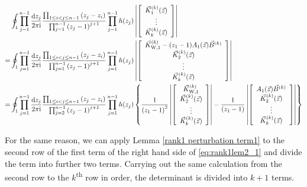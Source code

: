 \documentclass[cmp]{svjour}
\numberwithin{theorem}{section}
\numberwithin{equation}{section}
\def\dd{{\rm d}}
\def\ii{{\rm i}}
\begin{document}
\begin{align}
& \oint_{1} \prod_{j=1}^{n-1}{ \frac{\dd z_j}{2 \pi \ii} } \frac{ \prod_{1 \leq i < j \leq n-1}{(z_j - z_i)} }{ \prod_{j=1}^{n-1}{{(z_j -1)}^{j+1}} } \prod_{j=1}^{n-1}{h(z_j)} 
\left|
\left[
\begin{array}{c}
\vec{K}^{(k)}_{1}(\vec{z})  \\
\vdots \\
\vec{K}^{(k)}_{k}(\vec{z}) 
\end{array}
\right]
\right| \nonumber \\
= &  \oint_{1} \prod_{j=1}^{n-1}{ \frac{\dd z_j}{2 \pi \ii} } \frac{ \prod_{1 \leq i < j \leq n-1}{(z_j - z_i)} }{ \prod_{j=1}^{n-1}{{(z_j -1)}^{j+1}} } \prod_{j=1}^{n-1}{h(z_j)} 
\left|
\left[
\begin{array}{c}
\vec{K}^{(k)}_{\mathrm{W} ,1} - (z_1 - 1) A_1(\vec{z}) \vec{B}^{(k)}\\
\vec{K}^{(k)}_{2}(\vec{z})  \\
\vdots  \\
\vec{K}^{(k)}_{k}(\vec{z}) 
\end{array}
\right]
\right| \nonumber \\
= & \oint_{1} \prod_{j=1}^{n-1}{ \frac{\dd z_j}{2 \pi \ii} } \frac{ \prod_{1 \leq i < j \leq n-1}{(z_j - z_i)}  }{ \prod_{j=2}^{n-1}{{(z_j -1)}^{j+1}} } \prod_{j=1}^{n-1}{h(z_j)} \left\{
\frac{1}{{(z_1 - 1)}^2}
\left|
\left[
\begin{array}{c}
\vec{K}^{(k)}_{\mathrm{W} ,1}  \\
\vec{K}^{(k)}_{2}(\vec{z}) \\
\vdots  \\
\vec{K}^{(k)}_{k}(\vec{z}) 
\end{array}
\right]
\right|  -   \frac{1}{(z_1 - 1)}
\left|
\left[
\begin{array}{c}
 A_1(\vec{z}) \vec{B}^{(k)} \\
\vec{K}^{(k)}_{2}(\vec{z})  \\
\vdots  \\
\vec{K}^{(k)}_{k}(\vec{z})
\end{array}
\right]
\right|  \right\} \label{eq:rank1lem2_1}
\end{align}


For the same reason, we can apply Lemma \ref{rank1 perturbation term1} to the second row of the first term of the right hand side of \eqref{eq:rank1lem2_1} and divide the term into further two terms.
Carrying out the same calculation from the second row to the $k$\textsuperscript{th} row in order, the determinant is divided into $k+1$ terms.
\end{document}
